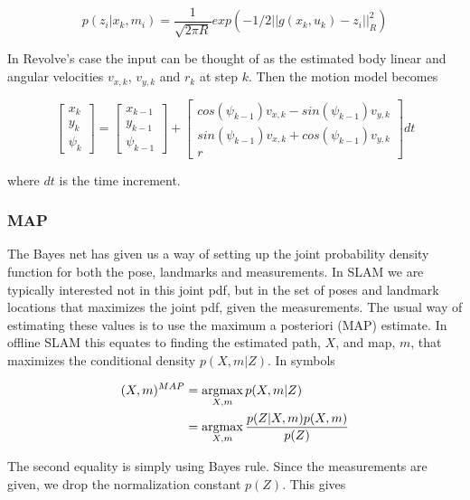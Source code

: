 \begin{equation}
    p(z_i|x_k,m_i) = \frac{1}{\sqrt{2\pi R}}exp(-1/2||g(x_k,u_k) - z_i||^2_R)
\end{equation}

In Revolve's case the input can be thought of as the estimated body linear and angular velocities $v_{x,k}$, $v_{y,k}$ and $r_k$ at step $k$. Then the motion model becomes 

\begin{equation}
    \begin{bmatrix} x_k \\ y_k \\ \psi_k \end{bmatrix} = \begin{bmatrix} x_{k-1} \\ y_{k-1} \\ \psi_{k-1} \end{bmatrix} + \begin{bmatrix} cos(\psi_{k-1})v_{x,k} - sin(\psi_{k-1})v_{y,k} \\
    sin(\psi_{k-1})v_{x,k} + cos(\psi_{k-1})v_{y,k} \\ r
    \end{bmatrix} dt
\end{equation}

where $dt$ is the time increment.

\subsubsection{MAP}

The Bayes net has given us a way of setting up the joint probability density function for both the pose, landmarks and measurements. In SLAM we are typically interested not in this joint pdf, but in the set of poses and landmark locations that maximizes the joint pdf, given the measurements. The usual way of estimating these values is to use the maximum a posteriori (MAP) estimate. In offline SLAM this equates to finding the estimated path, $X$, and map, $m$, that maximizes the conditional density $p(X,m|Z)$. In symbols

\begin{align}
    (X,m)^{MAP} &= \operatorname*{argmax}_{X,m}p(X,m|Z) \\
    &= \operatorname*{argmax}_{X,m}\frac{p(Z|X,m)p(X,m)}{p(Z)}
\end{align}

The second equality is simply using Bayes rule. Since the measurements are given, we drop the normalization constant $p(Z)$. This gives

